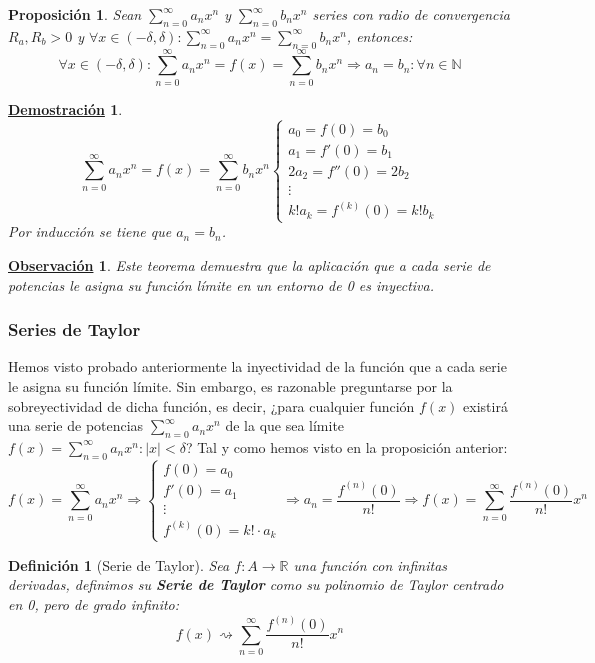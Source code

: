 \documentclass[10pt,a4paper,openright]{book}
\theoremstyle{break}
\newtheorem{defi}{Definición}[chapter]
\newtheorem{prop}{Proposición}[chapter]
\newtheorem*{demo}{\underline{Demostración}}
\newtheorem{obs}{\underline{Observación}}[chapter]
\begin{document}
\begin{prop}
Sean $\sum_{n=0}^{\infty} a_n x^n$ y $\sum_{n=0}^{\infty} b_n x^n$ series con radio de convergencia $R_a, R_b >0$ y $\forall x \in (-\delta, \delta) : \sum_{n=0}^{\infty} a_n x^n = \sum_{n=0}^{\infty} b_n x^n$, entonces:
$$\forall x \in (-\delta, \delta) : \sum_{n=0}^{\infty} a_n x^n = f(x)=\sum_{n=0}^{\infty} b_n x^n \Rightarrow a_n = b_n : \forall n \in \mathbb{N}$$
\end{prop}
\begin{demo}
$$\sum_{n=0}^{\infty} a_n x^n = f(x) = \sum_{n=0}^{\infty} b_n x^n \begin{cases} a_0 = f(0) = b_0 \\ a_1 = f'(0) = b_1 \\ 2 a_2 = f''(0) = 2 b_2 \\ \vdots \\ k! a_k = f^{(k)}(0) = k! b_k \end{cases}$$
Por inducción se tiene que $a_n = b_n$.
\end{demo}

\begin{obs}
Este teorema demuestra que la aplicación que a cada serie de potencias le asigna su función límite en un entorno de 0 es inyectiva.
\end{obs}

\subsubsection{Series de Taylor}
Hemos visto probado anteriormente la inyectividad de la función que a cada serie le asigna su función límite. Sin embargo, es razonable preguntarse por la sobreyectividad de dicha función, es decir, ¿para cualquier función $f(x)$ existirá una serie de potencias $\sum_{n= 0}^{\infty} a_n x^n $ de la que sea límite $f(x) = \sum_{n= 0}^{\infty} a_n x^n : |x| < \delta$? Tal y como hemos visto en la proposición anterior:
$$f(x) = \sum_{n= 0}^{\infty} a_n x^n \Rightarrow \begin{cases} f(0) = a_0 \\ f'(0) = a_1 \\ \vdots \\ f^{(k)}(0) = k! \cdot a_k 
\end{cases} \Rightarrow a_n = \frac{f^{(n)}(0)}{n!} \Rightarrow f(x) = \sum_{n=0}^{\infty} \frac{f^{(n)}(0)}{n!} x^n$$

\begin{defi}[Serie de Taylor]
Sea $f: A \rightarrow \mathbb{R}$ una función con infinitas derivadas, definimos su \textbf{Serie de Taylor} como su polinomio de Taylor centrado en 0, pero de grado infinito:
$$f(x) \rightsquigarrow \sum_{n=0}^{\infty} \frac{f^{(n)}(0)}{n!} x^n $$
\end{defi}
\end{document}
